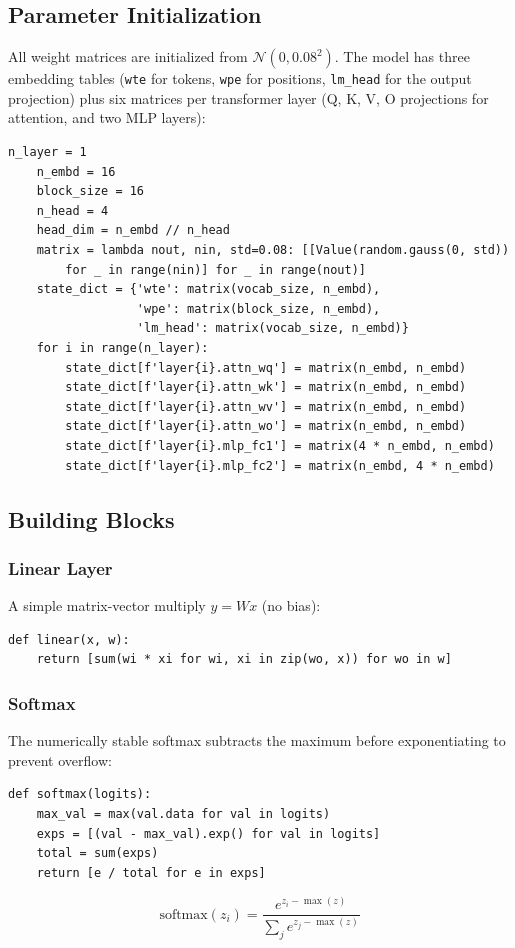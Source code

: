 \documentclass[11pt,a4paper]{article}
\begin{document}
\subsection{Parameter Initialization}

All weight matrices are initialized from $\mathcal{N}(0, 0.08^2)$. The model has three embedding tables (\texttt{wte} for tokens, \texttt{wpe} for positions, \texttt{lm\_head} for the output projection) plus six matrices per transformer layer (Q, K, V, O projections for attention, and two MLP layers):

\begin{lstlisting}[firstnumber=130]
    n_layer = 1
    n_embd = 16
    block_size = 16
    n_head = 4
    head_dim = n_embd // n_head
    matrix = lambda nout, nin, std=0.08: [[Value(random.gauss(0, std))
        for _ in range(nin)] for _ in range(nout)]
    state_dict = {'wte': matrix(vocab_size, n_embd),
                  'wpe': matrix(block_size, n_embd),
                  'lm_head': matrix(vocab_size, n_embd)}
    for i in range(n_layer):
        state_dict[f'layer{i}.attn_wq'] = matrix(n_embd, n_embd)
        state_dict[f'layer{i}.attn_wk'] = matrix(n_embd, n_embd)
        state_dict[f'layer{i}.attn_wv'] = matrix(n_embd, n_embd)
        state_dict[f'layer{i}.attn_wo'] = matrix(n_embd, n_embd)
        state_dict[f'layer{i}.mlp_fc1'] = matrix(4 * n_embd, n_embd)
        state_dict[f'layer{i}.mlp_fc2'] = matrix(n_embd, 4 * n_embd)
\end{lstlisting}

\subsection{Building Blocks}

\subsubsection{Linear Layer}
A simple matrix-vector multiply $y = Wx$ (no bias):
\begin{lstlisting}[firstnumber=149]
def linear(x, w):
    return [sum(wi * xi for wi, xi in zip(wo, x)) for wo in w]
\end{lstlisting}

\subsubsection{Softmax}
The numerically stable softmax subtracts the maximum before exponentiating to prevent overflow:
\begin{lstlisting}[firstnumber=152]
def softmax(logits):
    max_val = max(val.data for val in logits)
    exps = [(val - max_val).exp() for val in logits]
    total = sum(exps)
    return [e / total for e in exps]
\end{lstlisting}
\[
\text{softmax}(z_i) = \frac{e^{z_i - \max(z)}}{\sum_j e^{z_j - \max(z)}}
\]
\end{document}
